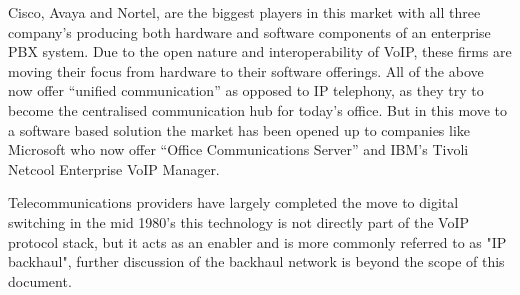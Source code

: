 Cisco, Avaya and Nortel, are the biggest players in this market with all three company's producing both hardware and software components of an enterprise PBX system. Due to the open nature and interoperability of VoIP, these firms are moving their focus from hardware to their software offerings. All of the above now offer “unified communication” as opposed to IP telephony, as they try to become the centralised communication hub for today's office. But in this move to a software based solution the market has been opened up to companies like Microsoft who now offer “Office Communications Server”\cite{website:microsoft_enter_uc} and IBM’s Tivoli Netcool Enterprise VoIP Manager.

Telecommunications providers have largely completed the move to digital switching in the mid 1980’s\cite{TelecommsSaN05}  this technology is not directly part of the VoIP protocol stack, but it acts as an enabler and is more commonly referred to as "IP backhaul", further discussion of the backhaul network is beyond the scope of this document.
